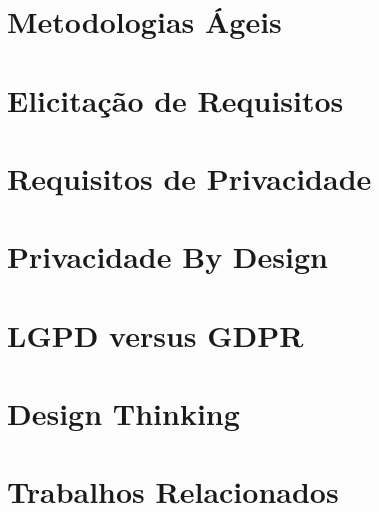 \label{referencial}
\section{Metodologias Ágeis}


\section{Elicitação de Requisitos}

\section{Requisitos de Privacidade}


\section{Privacidade By Design}


\section{LGPD versus GDPR}



\section{Design Thinking}



\section{Trabalhos Relacionados}




